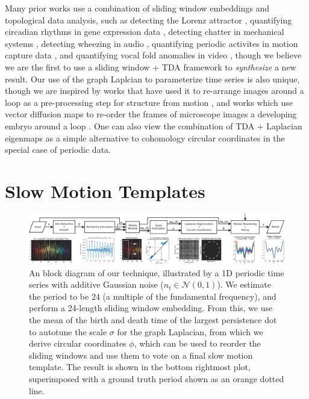 \documentclass{article}
\begin{document}
Many prior works use a combination of sliding window embeddings and topological data analysis, such as detecting the Lorenz attractor \cite{de2012topological}, quantifying circadian rhythms in gene expression data \cite{perea2015sliding}, detecting chatter in mechanical systems \cite{khasawneh2016chatter}, detecting wheezing in audio \cite{emrani2014real}, quantifying periodic activites in motion capture data \cite{vejdemo2015cohomological, venkataraman2016persistent}, and quantifying vocal fold anomalies in video \cite{tralie2017quasi}, though we believe we are the first to use a sliding window + TDA framework to {\em synthesize} a new result.  Our use of the graph Laplcian to parameterize time series is also unique, though we are inspired by works that have used it to re-arrange images around a loop as a pre-processing step for structure from motion \cite{averbuch2015ringit}, and works which use vector diffusion maps to re-order the frames of microscope images a developing embryo around a loop \cite{dsilva2015diffusionvecordering}.  One can also view the combination of TDA + Laplacian eigenmaps as a simple alternative to cohomology circular coordinates \cite{de2011persistent,vejdemo2015cohomological} in the special case of periodic data.


\section{Slow Motion Templates}
\label{sec:methods}

\begin{figure}[h!]
\centering
\includegraphics[width=\textwidth]{BlockDiagram.pdf}
\caption{An block diagram of our technique, illustrated by a 1D periodic time series with additive Gaussian noise ($n_t \in \mathcal{N}(0, 1)$).  We estimate the period to be 24 (a multiple of the fundamental frequency), and perform a 24-length sliding window embedding.  From this, we use the mean of the birth and death time of the largest persistence dot to autotune the scale $\sigma$ for the graph Laplacian, from which we derive circular coordinates $\phi$, which can be used to reorder the sliding windows and use them to vote on a final slow motion template.  The result is shown in the bottom rightmost plot, superimposed with a ground truth period shown as an orange dotted line.}
\label{fig:ConceptFigure}
\end{figure}
\end{document}
